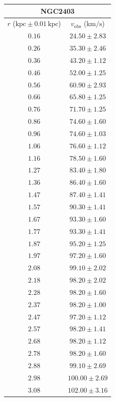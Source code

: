 \documentclass{article}
\newcommand\kpc{\textrm{kpc}}
\newcommand\kmps{\textrm{km}/\textrm{s}}
\newcommand\vobs{\ensuremath{v_{\textrm{obs}}}}
\begin{document}
\begin{table}[h!]
    \begin{tabular}{|c|c|}
        \hline
        \multicolumn{2}{|c|}{NGC2403} \\
        \hline
        $r$ ($\kpc \pm 0.01 \,\kpc$) & $\vobs$ ($\kmps$) \\
        \hline
        $0.16$ & $24.50 \pm 2.83$ \\
        $0.26$ & $35.30 \pm 2.46$ \\
        $0.36$ & $43.20 \pm 1.12$ \\
        $0.46$ & $52.00 \pm 1.25$ \\
        $0.56$ & $60.90 \pm 2.93$ \\
        $0.66$ & $65.80 \pm 1.25$ \\
        $0.76$ & $71.70 \pm 1.25$ \\
        $0.86$ & $74.60 \pm 1.60$ \\
        $0.96$ & $74.60 \pm 1.03$ \\
        $1.06$ & $76.60 \pm 1.12$ \\
        $1.16$ & $78.50 \pm 1.60$ \\
        $1.27$ & $83.40 \pm 1.80$ \\
        $1.36$ & $86.40 \pm 1.60$ \\
        $1.47$ & $87.40 \pm 1.41$ \\
        $1.57$ & $90.30 \pm 1.41$ \\
        $1.67$ & $93.30 \pm 1.60$ \\
        $1.77$ & $93.30 \pm 1.41$ \\
        $1.87$ & $95.20 \pm 1.25$ \\
        $1.97$ & $97.20 \pm 1.60$ \\
        $2.08$ & $99.10 \pm 2.02$ \\
        $2.18$ & $98.20 \pm 2.02$ \\
        $2.28$ & $98.20 \pm 1.60$ \\
        $2.37$ & $98.20 \pm 1.00$ \\
        $2.47$ & $97.20 \pm 1.12$ \\
        $2.57$ & $98.20 \pm 1.41$ \\
        $2.68$ & $98.20 \pm 1.12$ \\
        $2.78$ & $98.20 \pm 1.60$ \\
        $2.88$ & $99.10 \pm 2.69$ \\
        $2.98$ & $100.00 \pm 2.69$ \\
        $3.08$ & $102.00 \pm 3.16$ \\

\end{tabular}
\end{table}
\end{document}
